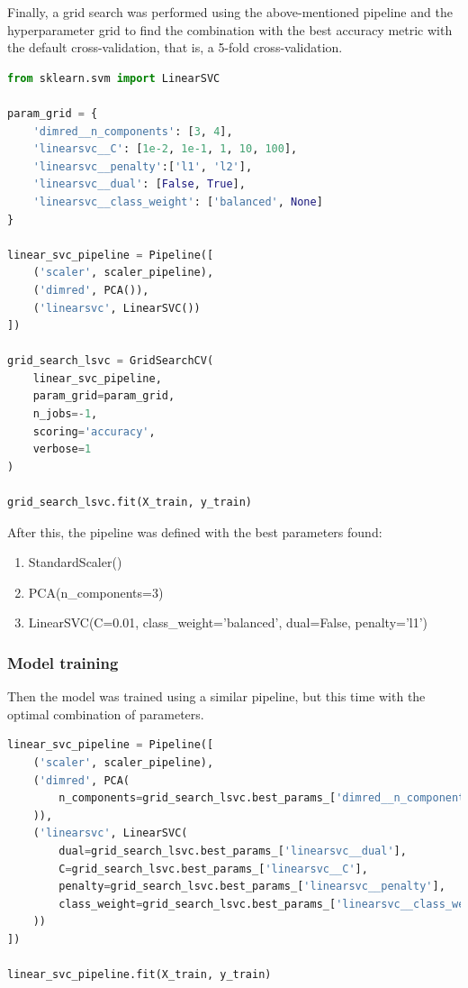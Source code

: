 \documentclass{article}
\begin{document}
Finally, a grid search was performed using the above-mentioned pipeline and the hyperparameter grid to find the combination with the best accuracy metric with the default cross-validation, that is, a 5-fold cross-validation.
\begin{lstlisting}[language=Python]
from sklearn.svm import LinearSVC

param_grid = {
    'dimred__n_components': [3, 4], 
    'linearsvc__C': [1e-2, 1e-1, 1, 10, 100],
    'linearsvc__penalty':['l1', 'l2'],
    'linearsvc__dual': [False, True],
    'linearsvc__class_weight': ['balanced', None]
}

linear_svc_pipeline = Pipeline([
    ('scaler', scaler_pipeline), 
    ('dimred', PCA()), 
    ('linearsvc', LinearSVC())
])

grid_search_lsvc = GridSearchCV(
    linear_svc_pipeline,
    param_grid=param_grid,
    n_jobs=-1,
    scoring='accuracy',
    verbose=1
)

grid_search_lsvc.fit(X_train, y_train)
\end{lstlisting}

After this, the pipeline was defined with the best parameters found:
\begin{enumerate}
    \item StandardScaler()
    \item PCA(n\_components=3)
    \item LinearSVC(C=0.01, class\_weight='balanced', dual=False, penalty='l1')
\end{enumerate}

\subsubsection{Model training}
Then the model was trained using a similar pipeline, but this time with the optimal combination of parameters.

\begin{lstlisting}[language=Python]
linear_svc_pipeline = Pipeline([
    ('scaler', scaler_pipeline), 
    ('dimred', PCA(
        n_components=grid_search_lsvc.best_params_['dimred__n_components']
    )),
    ('linearsvc', LinearSVC(
        dual=grid_search_lsvc.best_params_['linearsvc__dual'],
        C=grid_search_lsvc.best_params_['linearsvc__C'],
        penalty=grid_search_lsvc.best_params_['linearsvc__penalty'],
        class_weight=grid_search_lsvc.best_params_['linearsvc__class_weight']
    ))
])

linear_svc_pipeline.fit(X_train, y_train)
\end{lstlisting}
\end{document}
